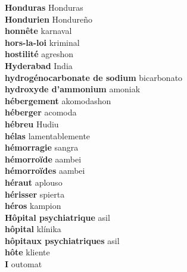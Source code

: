 \textbf{ Honduras  } Honduras \\
\textbf{ Hondurien  } Hondureño \\
\textbf{ honnête  } karnaval \\
\textbf{ hors-la-loi  } kriminal \\
\textbf{ hostilité  } agreshon \\
\textbf{ Hyderabad  } India \\
\textbf{ hydrogénocarbonate de sodium  } bicarbonato \\
\textbf{ hydroxyde d’ammonium  } amoniak \\
\textbf{ hébergement  } akomodashon \\
\textbf{ héberger  } acomoda \\
\textbf{ hébreu  } Hudiu \\
\textbf{ hélas  } lamentablemente \\
\textbf{ hémorragie  } sangra \\
\textbf{ hémorroïde  } aambei \\
\textbf{ hémorroïdes  } aambei \\
\textbf{ héraut  } aplouso \\
\textbf{ hérisser  } spierta \\
\textbf{ héros  } kampion \\
\textbf{ Hôpital psychiatrique  } asil \\
\textbf{ hôpital  } klínika \\
\textbf{ hôpitaux psychiatriques  } asil \\
\textbf{ hôte  } kliente \\
\textbf{ I  } outomat \\
